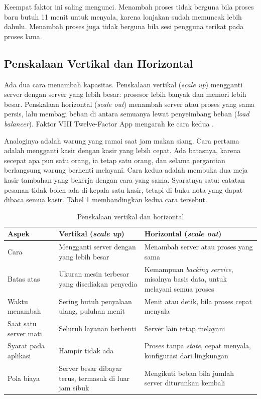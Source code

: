 Keempat faktor ini saling mengunci. Menambah proses tidak berguna bila proses baru butuh 11
menit untuk menyala, karena lonjakan sudah memuncak lebih dahulu. Menambah proses juga tidak
berguna bila sesi pengguna terikat pada proses lama.

\subsection{Penskalaan Vertikal dan Horizontal}

Ada dua cara menambah kapasitas. Penskalaan vertikal (\textit{scale up}) mengganti server
dengan server yang lebih besar: prosesor lebih banyak dan memori lebih besar. Penskalaan
horizontal (\textit{scale out}) menambah server atau proses yang sama persis, lalu membagi
beban di antara semuanya lewat penyeimbang beban (\textit{load balancer}). Faktor VIII
Twelve-Factor App mengarah ke cara kedua \cite{twelvefactor}.

Analoginya adalah warung yang ramai saat jam makan siang. Cara pertama adalah mengganti
kasir dengan kasir yang lebih cepat. Ada batasnya, karena secepat apa pun satu orang, ia
tetap satu orang, dan selama pergantian berlangsung warung berhenti melayani. Cara kedua
adalah membuka dua meja kasir tambahan yang bekerja dengan cara yang sama. Syaratnya satu:
catatan pesanan tidak boleh ada di kepala satu kasir, tetapi di buku nota yang dapat dibaca
semua kasir. Tabel \ref{tab:ch05-vertikal-horizontal} membandingkan kedua cara tersebut.

\begin{table}[!htb]
  \centering
  \footnotesize
  \caption{Penskalaan vertikal dan horizontal}
  \label{tab:ch05-vertikal-horizontal}
  \begin{tabularx}{\textwidth}{>{\raggedright\arraybackslash}p{2.3cm}
    >{\raggedright\arraybackslash}X >{\raggedright\arraybackslash}X}
    \hline
    \textbf{Aspek} & \textbf{Vertikal (\textit{scale up})} & \textbf{Horizontal
      (\textit{scale out})} \\
    \hline
    Cara & Mengganti server dengan yang lebih besar & Menambah server atau proses yang
      sama \\
    \hline
    Batas atas & Ukuran mesin terbesar yang disediakan penyedia & Kemampuan
      \textit{backing service}, misalnya basis data, untuk melayani semua proses \\
    \hline
    Waktu menambah & Sering butuh penyalaan ulang, puluhan menit & Menit atau detik, bila
      proses cepat menyala \\
    \hline
    Saat satu server mati & Seluruh layanan berhenti & Server lain tetap melayani \\
    \hline
    Syarat pada aplikasi & Hampir tidak ada & Proses tanpa \textit{state}, cepat menyala,
      konfigurasi dari lingkungan \\
    \hline
    Pola biaya & Server besar dibayar terus, termasuk di luar jam sibuk & Mengikuti beban
      bila jumlah server diturunkan kembali \\
    \hline
  \end{tabularx}
\end{table}


